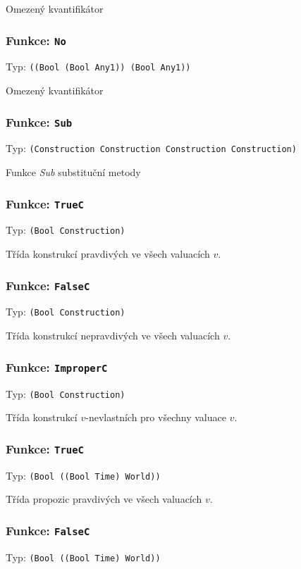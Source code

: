 Omezený kvantifikátor

\subsubsection*{Funkce: \lstinline|No|}
Typ: \lstinline|((Bool (Bool Any1)) (Bool Any1))|

Omezený kvantifikátor

\subsubsection*{Funkce: \lstinline|Sub|}
Typ: \lstinline|(Construction Construction Construction Construction)|

Funkce \textit{Sub} substituční metody

\subsubsection*{Funkce: \lstinline|TrueC|}
Typ: \lstinline|(Bool Construction)|

Třída konstrukcí pravdivých ve všech valuacích $v$.

\subsubsection*{Funkce: \lstinline|FalseC|}
Typ: \lstinline|(Bool Construction)|

Třída konstrukcí nepravdivých ve všech valuacích $v$.

\subsubsection*{Funkce: \lstinline|ImproperC|}
Typ: \lstinline|(Bool Construction)|

Třída konstrukcí $v$-nevlastních pro všechny valuace $v$.

\subsubsection*{Funkce: \lstinline|TrueC|}
Typ: \lstinline|(Bool ((Bool Time) World))|

Třída propozic pravdivých ve všech valuacích $v$.

\subsubsection*{Funkce: \lstinline|FalseC|}
Typ: \lstinline|(Bool ((Bool Time) World))|


